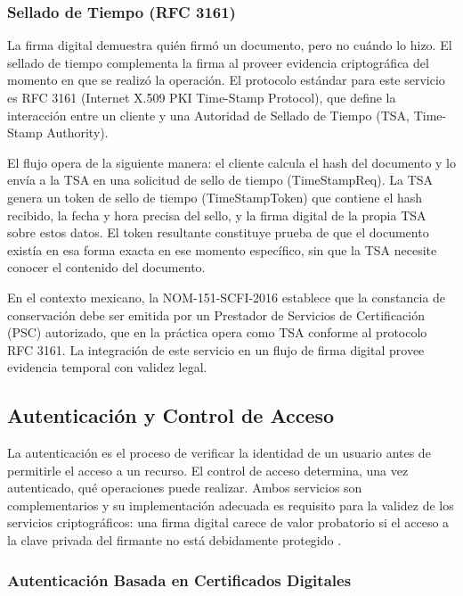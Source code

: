 \subsubsection{Sellado de Tiempo (RFC 3161)}

La firma digital demuestra quién firmó un documento, pero no cuándo lo hizo. El sellado de tiempo complementa la firma al proveer evidencia criptográfica del momento en que se realizó la operación. El protocolo estándar para este servicio es RFC 3161 \cite{adams2001} (Internet X.509 PKI Time-Stamp Protocol), que define la interacción entre un cliente y una Autoridad de Sellado de Tiempo (TSA, Time-Stamp Authority).

El flujo opera de la siguiente manera: el cliente calcula el hash del documento y lo envía a la TSA en una solicitud de sello de tiempo (TimeStampReq). La TSA genera un token de sello de tiempo (TimeStampToken) que contiene el hash recibido, la fecha y hora precisa del sello, y la firma digital de la propia TSA sobre estos datos. El token resultante constituye prueba de que el documento existía en esa forma exacta en ese momento específico, sin que la TSA necesite conocer el contenido del documento.

En el contexto mexicano, la NOM-151-SCFI-2016 establece que la constancia de conservación debe ser emitida por un Prestador de Servicios de Certificación (PSC) autorizado, que en la práctica opera como TSA conforme al protocolo RFC 3161. La integración de este servicio en un flujo de firma digital provee evidencia temporal con validez legal.

\subsection{Autenticación y Control de Acceso}\label{sec:autenticacion-acceso}

La autenticación es el proceso de verificar la identidad de un usuario antes de permitirle el acceso a un recurso. El control de acceso determina, una vez autenticado, qué operaciones puede realizar. Ambos servicios son complementarios y su implementación adecuada es requisito para la validez de los servicios criptográficos: una firma digital carece de valor probatorio si el acceso a la clave privada del firmante no está debidamente protegido \cite{stallings2017}.

\subsubsection{Autenticación Basada en Certificados Digitales}

